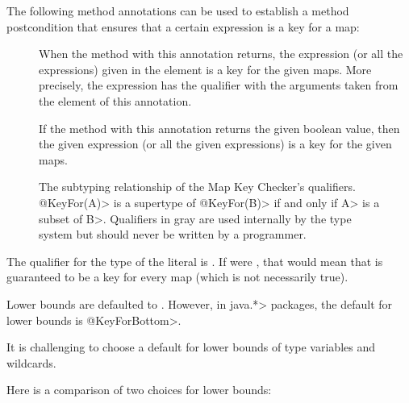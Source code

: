 The following method annotations can be used to establish a method postcondition
that ensures that a certain expression is a key for a map:

\begin{description}
\item[]
  When the method with this annotation returns, the expression (or all the
  expressions) given in the  element is a key for the given
  maps. More precisely, the expression has the  qualifier
  with the  arguments taken from the  element
  of this annotation.
\item[]
  If the method with this annotation returns the given boolean value,
  then the given expression (or all the given expressions)
  is a key for the given maps.
\end{description}

\begin{figure}
\caption{The subtyping relationship of the Map Key Checker's qualifiers.
\<@KeyFor(A)> is a supertype of \<@KeyFor(B)> if and only if \<A> is a subset of
\<B>.  Qualifiers in gray are used internally by the type system but should
never be written by a programmer.}
\label{fig-map-key-keyfor-hierarchy}
\end{figure}


The qualifier for the type of the  literal is .
If  were , that would mean that
 is guaranteed to be a key for every map (which is not
necessarily true).


Lower bounds are defaulted to .
However, in \<java.*> packages, the default for lower bounds is
\<@KeyForBottom>.

It is challenging to choose a default for lower bounds of type variables
and wildcards.

Here is a comparison of two choices for lower bounds:

\medskip

